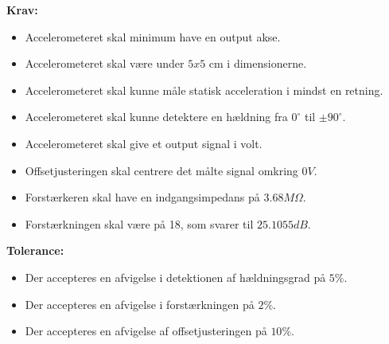 \noindent\textbf{Krav:}
\begin{itemize}
	\item Accelerometeret skal minimum have en output akse.%
	\item Accelerometeret skal være under $5x5$ cm i dimensionerne.%
	\item Accelerometeret skal kunne måle statisk acceleration i mindst en retning.
	\item Accelerometeret skal kunne detektere en hældning fra $0^{\circ}$ til $\pm90^{\circ}$.
	\item Accelerometeret skal give et output signal i volt.
	\item Offsetjusteringen skal centrere det målte signal omkring $0V$.
	\item Forstærkeren skal have en indgangsimpedans på $3.68M\Omega$.%
	\item Forstærkningen skal være på 18, som svarer til $25.1055dB$.
\end{itemize}
\textbf{Tolerance:}
\begin{itemize}
	\item Der accepteres en afvigelse i detektionen af hældningsgrad på $5\%$.
	\item Der accepteres en afvigelse i forstærkningen på $2\%$.
	\item Der accepteres en afvigelse af offsetjusteringen på $10\%$.
\end{itemize}
